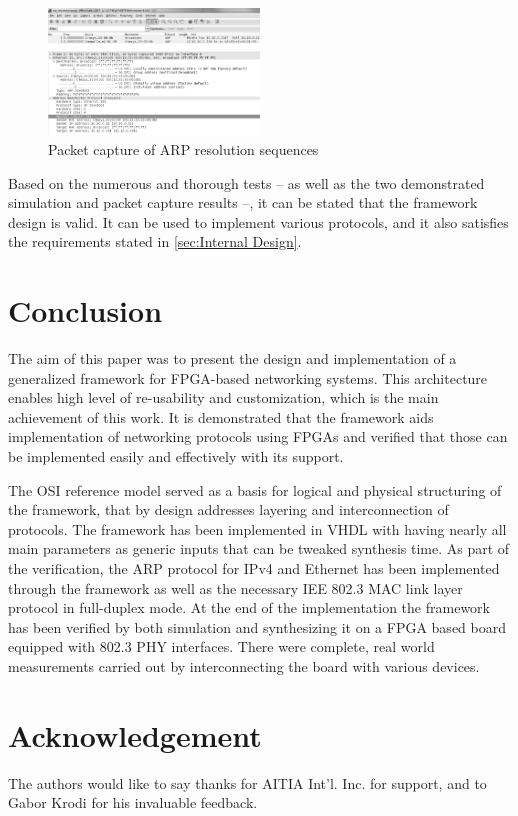 \documentclass[conference]{IEEEtran}
\begin{document}
\begin{figure}[!htb]
    \centering
    \includegraphics[width=0.5\textwidth]{figures_raw/arp_transaction.png}
    \caption{Packet capture of ARP resolution sequences}
    \label{fig:pcap_arp_seq}
\end{figure}

Based on the numerous and thorough tests -- as well as the two demonstrated simulation and packet capture results --,
it can be stated that the framework design is valid. It can be used to implement various protocols, and it also
satisfies the requirements stated in \ref{sec:Internal Design}.

\section{Conclusion}

The aim of this paper was to present the design and implementation of a generalized framework for FPGA-based networking
systems. This architecture enables high level of re-usability and customization, which is the main achievement of this
work. It is demonstrated that the framework aids implementation of networking protocols using FPGAs and verified that
those can be implemented easily and effectively with its support.

The OSI reference model served as a basis for logical and physical structuring of the framework, that by design
addresses layering and interconnection of protocols. The framework has been implemented in VHDL with having nearly all
main parameters as generic inputs that can be tweaked synthesis time. As part of the verification, the ARP protocol for
IPv4 and Ethernet has been implemented through the framework as well as the  necessary IEE 802.3 MAC link layer
protocol in full-duplex mode.
At the end of the implementation the framework has been verified by both simulation and synthesizing it on a FPGA based
board equipped with 802.3 PHY interfaces. There were complete, real world measurements carried out by interconnecting
the board with various devices.

\section{Acknowledgement}
The authors would like to say thanks for AITIA Int’l. Inc. for support, and to Gabor Krodi for his invaluable feedback.
\end{document}
